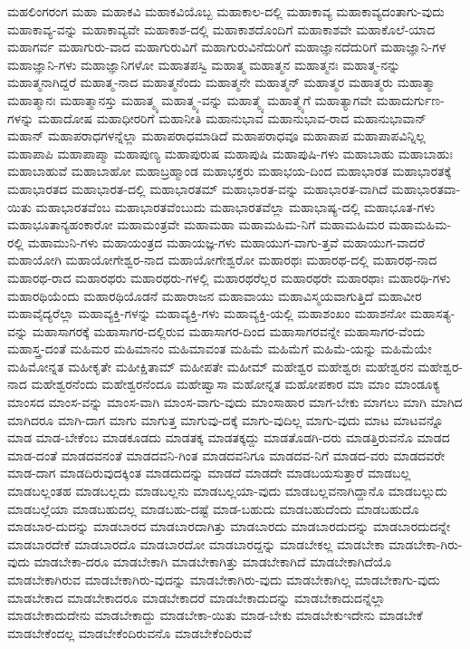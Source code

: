 {ಮಹಲಿಂಗರಂಗ
ಮಹಾ
ಮಹಾಕವಿ
ಮಹಾಕವಿಯೊಬ್ಬ
ಮಹಾಕಾಲ-ದಲ್ಲಿ
ಮಹಾಕಾವ್ಯ
ಮಹಾಕಾವ್ಯದಂತಾಗು-ವುದು
ಮಹಾಕಾವ್ಯ-ವನ್ನು
ಮಹಾಕಾವ್ಯವೇ
ಮಹಾಕಾಶ-ದಲ್ಲಿ
ಮಹಾಕಾಶದೊಂದಿಗೆ
ಮಹಾಕಾಶವೇ
ಮಹಾಕೊಲೆ-ಯಾದ
ಮಹಾಗರ್ವ
ಮಹಾಗುರು-ವಾದ
ಮಹಾಗುರುವಿಗೆ
ಮಹಾಗುರುವಿನೆದುರಿಗೆ
ಮಹಾಜ್ಞಾನದೆದುರಿಗೆ
ಮಹಾಜ್ಞಾನಿ-ಗಳ
ಮಹಾಜ್ಞಾನಿ-ಗಳು
ಮಹಾಜ್ಞಾನಿಗಳೋ
ಮಹಾತಪಸ್ವಿ
ಮಹಾತ್ಮ
ಮಹಾತ್ಮನ
ಮಹಾತ್ಮನಃ
ಮಹಾತ್ಮ-ನನ್ನು
ಮಹಾತ್ಮನಾಗಿದ್ದರೆ
ಮಹಾತ್ಮ-ನಾದ
ಮಹಾತ್ಮನೆಂದು
ಮಹಾತ್ಮನೇ
ಮಹಾತ್ಮನ್
ಮಹಾತ್ಮರ
ಮಹಾತ್ಮರು
ಮಹಾತ್ಮಾ
ಮಹಾತ್ಮಾನಃ
ಮಹಾತ್ಮಾನಸ್ತು
ಮಹಾತ್ಮ್ಯ
ಮಹಾತ್ಮ್ಯ-ವನ್ನು
ಮಹಾತ್ಮ್ಯೆ
ಮಹಾತ್ಮ್ಯೆಗೆ
ಮಹಾತ್ಯಾಗವೇ
ಮಹಾದುರ್ಗುಣ-ಗಳನ್ನು
ಮಹಾದೋಷ
ಮಹಾಧೀರರಿಗೆ
ಮಹಾನೀತಿ
ಮಹಾನುಭಾವ
ಮಹಾನುಭಾವ-ರಾದ
ಮಹಾನುಭಾವಾನ್
ಮಹಾನ್
ಮಹಾಪರಾಧಗಳನ್ನೆಲ್ಲಾ
ಮಹಾಪರಾಧಮಾಡಿದೆ
ಮಹಾಪರಾಧವೂ
ಮಹಾಪಾಪ
ಮಹಾಪಾಪವಿನ್ನಿಲ್ಲ
ಮಹಾಪಾಪಿ
ಮಹಾಪಾಪ್ಮಾ
ಮಹಾಪುಣ್ಯ
ಮಹಾಪುರುಷ
ಮಹಾಪುಷಿ
ಮಹಾಪುಷಿ-ಗಳು
ಮಹಾಬಾಹು
ಮಹಾಬಾಹುಃ
ಮಹಾಬಾಹುವೆ
ಮಹಾಬಾಹೋ
ಮಹಾಬ್ರಹ್ಮಾಂಡ
ಮಹಾಭಕ್ತರು
ಮಹಾಭಯ-ದಿಂದ
ಮಹಾಭಾರತ
ಮಹಾಭಾರತಕ್ಕೆ
ಮಹಾಭಾರತದ
ಮಹಾಭಾರತ-ದಲ್ಲಿ
ಮಹಾಭಾರತಮ್
ಮಹಾಭಾರತ-ವನ್ನು
ಮಹಾಭಾರತ-ವಾಗಿದೆ
ಮಹಾಭಾರತವಾ-ಯಿತು
ಮಹಾಭಾರತವೆಂಬ
ಮಹಾಭಾರತವೆಂಬುದು
ಮಹಾಭಾರತವೆಲ್ಲಾ
ಮಹಾಭಾಷ್ಯ-ದಲ್ಲಿ
ಮಹಾಭೂತ-ಗಳು
ಮಹಾಭೂತಾನ್ಯಹಂಕಾರೋ
ಮಹಾಮಂತ್ರವೇ
ಮಹಾಮಹಾ
ಮಹಾಮಹಿಮ-ನಿಗೆ
ಮಹಾಮಹಿಮರ
ಮಹಾಮಹಿಮ-ರಲ್ಲಿ
ಮಹಾಮುನಿ-ಗಳು
ಮಹಾಯಂತ್ರದ
ಮಹಾಯಜ್ಞ-ಗಳು
ಮಹಾಯುಗ-ವಾಗು-ತ್ತವೆ
ಮಹಾಯುಗ-ವಾದರೆ
ಮಹಾಯೋಗಿ
ಮಹಾಯೋಗೇಶ್ವರ-ನಾದ
ಮಹಾಯೋಗೇಶ್ವರೋ
ಮಹಾರಥಃ
ಮಹಾರಥ-ದಲ್ಲಿ
ಮಹಾರಥ-ನಾದ
ಮಹಾರಥ-ರಾದ
ಮಹಾರಥರು
ಮಹಾರಥರು-ಗಳಲ್ಲಿ
ಮಹಾರಥರೆಲ್ಲರ
ಮಹಾರಥರೇ
ಮಹಾರಥಾಃ
ಮಹಾರಥಿ-ಗಳು
ಮಹಾರಥಿಯೆಂದು
ಮಹಾರಥಿಯೊಡನೆ
ಮಹಾರಾಜನ
ಮಹಾವಾಯು
ಮಹಾವಿಸ್ಮಯವಾಗುತ್ತಿದೆ
ಮಹಾವೀರ
ಮಹಾವೈದ್ಯರೆಲ್ಲಾ
ಮಹಾವ್ಯಕ್ತಿ-ಗಳನ್ನು
ಮಹಾವ್ಯಕ್ತಿ-ಗಳು
ಮಹಾವ್ಯಕ್ತಿ-ಯಲ್ಲಿ
ಮಹಾಶಂಖಂ
ಮಹಾಶನೋ
ಮಹಾಸತ್ಯ-ವನ್ನು
ಮಹಾಸಾಗರಕ್ಕೆ
ಮಹಾಸಾಗರ-ದಲ್ಲಿರುವ
ಮಹಾಸಾಗರ-ದಿಂದ
ಮಹಾಸಾಗರವನ್ನೇ
ಮಹಾಸಾಗರ-ವೆಂದು
ಮಹಾಸ್ತ್ರ-ದಂತೆ
ಮಹಿಮರ
ಮಹಿಮಾನಂ
ಮಹಿಮಾವಂತ
ಮಹಿಮೆ
ಮಹಿಮೆಗೆ
ಮಹಿಮೆ-ಯನ್ನು
ಮಹಿಮೆಯೇ
ಮಹಿಮೋನ್ನತ
ಮಹೀಕೃತೇ
ಮಹೀಕ್ಷಿತಾಮ್
ಮಹೀಪತೇ
ಮಹೀಮ್
ಮಹೇಶ್ವರ
ಮಹೇಶ್ವರಃ
ಮಹೇಶ್ವರನ
ಮಹೇಶ್ವರ-ನಾದ
ಮಹೇಶ್ವರನೆಂದು
ಮಹೇಶ್ವರನೆಂದೂ
ಮಹೇಷ್ವಾಸಾ
ಮಹೋನ್ನತ
ಮಹೋಪಕಾರ
ಮಾ
ಮಾಂ
ಮಾಂಡೂಕ್ಯ
ಮಾಂಸದ
ಮಾಂಸ-ವನ್ನು
ಮಾಂಸ-ವಾಗಿ
ಮಾಂಸ-ವಾಗು-ವುದು
ಮಾಂಸಾಹಾರ
ಮಾಗ-ಬೇಕು
ಮಾಗಲು
ಮಾಗಿ
ಮಾಗಿದ
ಮಾಗಿದರೂ
ಮಾಗಿ-ದಾಗ
ಮಾಗು
ಮಾಗುತ್ತ
ಮಾಗುವು-ದಕ್ಕೆ
ಮಾಗು-ವುದಿಲ್ಲ
ಮಾಗು-ವುದು
ಮಾಟ
ಮಾಟವನ್ನೊ
ಮಾಡ
ಮಾಡ-ಬೇಕೆಂಬ
ಮಾಡಕೂಡದು
ಮಾಡತಕ್ಕ
ಮಾಡತಕ್ಕದ್ದು
ಮಾಡತೊಡಗಿ-ದರು
ಮಾಡತ್ತಿರುವನೊ
ಮಾಡದ
ಮಾಡ-ದಂತೆ
ಮಾಡದವನಂತೆ
ಮಾಡದವನಿ-ಗಿಂತ
ಮಾಡದವನಿಗೂ
ಮಾಡದವ-ನಿಗೆ
ಮಾಡದ-ವರು
ಮಾಡದವರೇ
ಮಾಡ-ದಾಗ
ಮಾಡದಿರುವುದಕ್ಕಿಂತ
ಮಾಡದುದನ್ನು
ಮಾಡದೆ
ಮಾಡದೇ
ಮಾಡಬಯಸುತ್ತಾರೆ
ಮಾಡಬಲ್ಲ
ಮಾಡಬಲ್ಲಂತಹ
ಮಾಡಬಲ್ಲದು
ಮಾಡಬಲ್ಲನು
ಮಾಡಬಲ್ಲಯಾ-ವುದು
ಮಾಡಬಲ್ಲವನಾಗಿದ್ದಾನೊ
ಮಾಡಬಲ್ಲುದು
ಮಾಡಬಲ್ಲೆಯಾ
ಮಾಡಬಹುದಲ್ಲ
ಮಾಡಬಹು-ದಷ್ಟೆ
ಮಾಡ-ಬಹುದು
ಮಾಡಬಹುದೆಂದು
ಮಾಡಬಹುದೊ
ಮಾಡಬಾರ-ದುದನ್ನು
ಮಾಡಬಾರದ
ಮಾಡಬಾರದಾಗಿತ್ತು
ಮಾಡಬಾರದು
ಮಾಡಬಾರದುದನ್ನು
ಮಾಡಬಾರದುದನ್ನೇ
ಮಾಡಬಾರದೇಕೆ
ಮಾಡಬಾರದೊ
ಮಾಡಬಾರದೋ
ಮಾಡಬಾರದ್ದನ್ನು
ಮಾಡಬೇಕಲ್ಲ
ಮಾಡಬೇಕಾ
ಮಾಡಬೇಕಾ-ಗಿರು-ವುದು
ಮಾಡಬೇಕಾ-ದರೂ
ಮಾಡಬೇಕಾಗಿ
ಮಾಡಬೇಕಾಗಿತ್ತು
ಮಾಡಬೇಕಾಗಿದೆ
ಮಾಡಬೇಕಾಗಿದೆಯೊ
ಮಾಡಬೇಕಾಗಿರುವ
ಮಾಡಬೇಕಾಗಿರು-ವುದನ್ನು
ಮಾಡಬೇಕಾಗಿರು-ವುದು
ಮಾಡಬೇಕಾಗಿಲ್ಲ
ಮಾಡಬೇಕಾಗು-ವುದು
ಮಾಡಬೇಕಾದ
ಮಾಡಬೇಕಾದರೂ
ಮಾಡಬೇಕಾದರೆ
ಮಾಡಬೇಕಾದುದನ್ನು
ಮಾಡಬೇಕಾದುದನ್ನೆಲ್ಲಾ
ಮಾಡಬೇಕಾದುದೇನು
ಮಾಡಬೇಕಾದ್ದು
ಮಾಡಬೇಕಾ-ಯಿತು
ಮಾಡ-ಬೇಕು
ಮಾಡಬೇಕುಇದೇನು
ಮಾಡಬೇಕೆ
ಮಾಡಬೇಕೆಂದಲ್ಲ
ಮಾಡಬೇಕೆಂದಿರುವನೊ
ಮಾಡಬೇಕೆಂದಿರುವೆ
}
